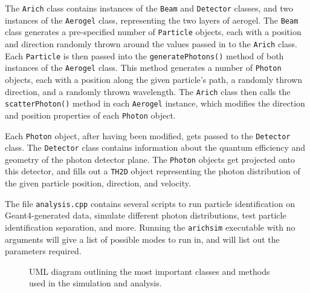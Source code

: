 The \verb!Arich! class contains instances of the  \verb!Beam! and  \verb!Detector! classes, and two instances of the  \verb!Aerogel! class, representing the two layers of aerogel.
The  \verb!Beam! class generates a pre-specified number of \verb!Particle! objects, each with a position and direction randomly thrown around the values passed in to the \verb!Arich! class.
Each \verb!Particle! is then passed into the \verb!generatePhotons()! method of both instances of the \verb!Aerogel! class.
This method generates a number of \verb!Photon! objects, each with a position along the given particle's path, a randomly thrown direction, and a randomly thrown wavelength.
The \verb!Arich! class then calls the \verb!scatterPhoton()! method in each \verb!Aerogel! instance, which modifies the direction and position properties of each \verb!Photon! object. 

Each \verb!Photon! object, after having been modified, gets passed to the \verb!Detector! class.
The \verb!Detector! class contains information about the quantum efficiency and geometry of the photon detector plane. 
The \verb!Photon! objects get projected onto this detector, and fills out a \verb!TH2D! object representing the photon distribution of the given particle position, direction, and velocity.

The file \verb!analysis.cpp! contains several scripts to run particle identification on Geant4-generated data, simulate different photon distributions, test particle identification separation, and more. 
Running the \verb!arichsim! executable with no arguments will give a list of possible modes to run in, and will list out the parameters required.


\begin{figure}
\centering
{}
\caption[UML diagram outlining the most important classes and methods used in the simulation and analysis ]{UML diagram outlining the most important classes and methods used in the simulation and analysis. }
\label{fig:uml}

\end{figure}



